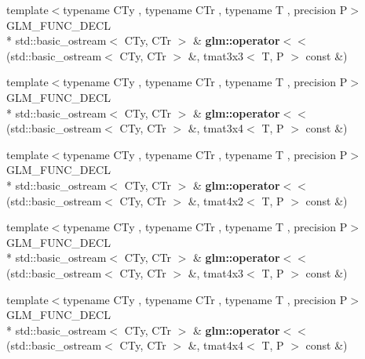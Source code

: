 \begin{DoxyCompactItemize}
\item 
\hypertarget{group__gtx__io_ga3ea3ca90bea2e763079f09af1e5d50ab}{{\footnotesize template$<$typename C\-Ty , typename C\-Tr , typename T , precision P$>$ }\\G\-L\-M\-\_\-\-F\-U\-N\-C\-\_\-\-D\-E\-C\-L \\*
std\-::basic\-\_\-ostream$<$ C\-Ty, C\-Tr $>$ \& {\bfseries glm\-::operator$<$$<$} (std\-::basic\-\_\-ostream$<$ C\-Ty, C\-Tr $>$ \&, tmat3x3$<$ T, P $>$ const \&)}\label{group__gtx__io_ga3ea3ca90bea2e763079f09af1e5d50ab}

\item 
\hypertarget{group__gtx__io_ga5a5ca6f99c027a2277b24de487198fe0}{{\footnotesize template$<$typename C\-Ty , typename C\-Tr , typename T , precision P$>$ }\\G\-L\-M\-\_\-\-F\-U\-N\-C\-\_\-\-D\-E\-C\-L \\*
std\-::basic\-\_\-ostream$<$ C\-Ty, C\-Tr $>$ \& {\bfseries glm\-::operator$<$$<$} (std\-::basic\-\_\-ostream$<$ C\-Ty, C\-Tr $>$ \&, tmat3x4$<$ T, P $>$ const \&)}\label{group__gtx__io_ga5a5ca6f99c027a2277b24de487198fe0}

\item 
\hypertarget{group__gtx__io_ga8ce3cf61260e62080a9596c2f10ab4a0}{{\footnotesize template$<$typename C\-Ty , typename C\-Tr , typename T , precision P$>$ }\\G\-L\-M\-\_\-\-F\-U\-N\-C\-\_\-\-D\-E\-C\-L \\*
std\-::basic\-\_\-ostream$<$ C\-Ty, C\-Tr $>$ \& {\bfseries glm\-::operator$<$$<$} (std\-::basic\-\_\-ostream$<$ C\-Ty, C\-Tr $>$ \&, tmat4x2$<$ T, P $>$ const \&)}\label{group__gtx__io_ga8ce3cf61260e62080a9596c2f10ab4a0}

\item 
\hypertarget{group__gtx__io_gaca75b14a0534a02860349a114a10aa44}{{\footnotesize template$<$typename C\-Ty , typename C\-Tr , typename T , precision P$>$ }\\G\-L\-M\-\_\-\-F\-U\-N\-C\-\_\-\-D\-E\-C\-L \\*
std\-::basic\-\_\-ostream$<$ C\-Ty, C\-Tr $>$ \& {\bfseries glm\-::operator$<$$<$} (std\-::basic\-\_\-ostream$<$ C\-Ty, C\-Tr $>$ \&, tmat4x3$<$ T, P $>$ const \&)}\label{group__gtx__io_gaca75b14a0534a02860349a114a10aa44}

\item 
\hypertarget{group__gtx__io_ga6683acc91ba7ce5822e25a2517550bff}{{\footnotesize template$<$typename C\-Ty , typename C\-Tr , typename T , precision P$>$ }\\G\-L\-M\-\_\-\-F\-U\-N\-C\-\_\-\-D\-E\-C\-L \\*
std\-::basic\-\_\-ostream$<$ C\-Ty, C\-Tr $>$ \& {\bfseries glm\-::operator$<$$<$} (std\-::basic\-\_\-ostream$<$ C\-Ty, C\-Tr $>$ \&, tmat4x4$<$ T, P $>$ const \&)}\label{group__gtx__io_ga6683acc91ba7ce5822e25a2517550bff}


\end{DoxyCompactItemize}
